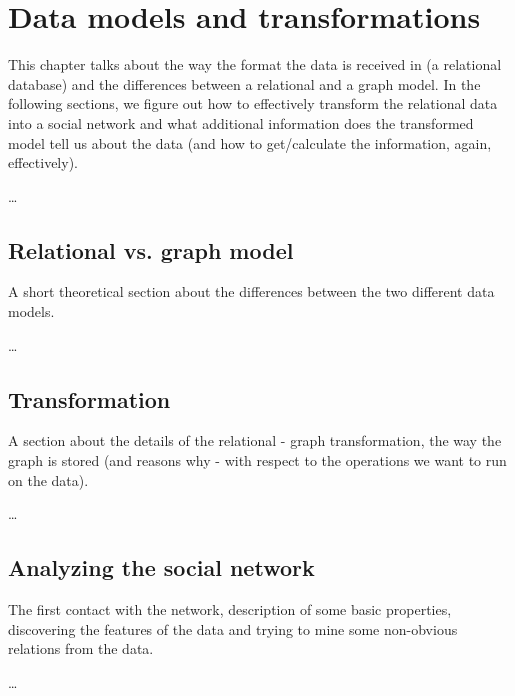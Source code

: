 \chapter{Data models and transformations}

This chapter talks about the way the format the data is received in (a relational database) and the differences between a relational and a graph model. In the following sections, we figure out how to effectively transform the relational data into a social network and what additional information does the transformed model tell us about the data (and how to get/calculate the information, again, effectively).  

\dots

\section{Relational vs. graph model}

A short theoretical section about the differences between the two different data models.

\dots

\section{Transformation}

A section about the details of the relational - graph transformation, the way the graph is stored (and reasons why - with respect to the operations we want to run on the data).

\dots

\section{Analyzing the social network}

The first contact with the network, description of some basic properties, discovering the features of the data and trying to mine some non-obvious relations from the data.

\dots
